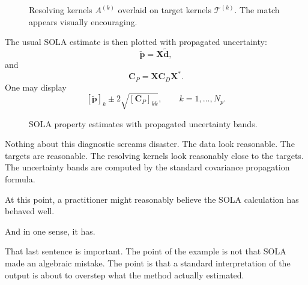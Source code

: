\documentclass[11pt,openany]{book}
\theoremstyle{definition}
\theoremstyle{remark}
\begin{document}
\begin{figure}[ht]
  \centering
  \caption{Resolving kernels \(A^{(k)}\) overlaid on target kernels
  \(\mathcal T^{(k)}\). The match appears visually encouraging.}
  \label{fig:act7-resolving-vs-target}
\end{figure}

The usual SOLA estimate is then plotted with propagated uncertainty:
\[
  \widetilde{\mathbf p}
  =
  \mathbf X\widetilde{\mathbf d},
\]
and
\[
  \mathbf C_P
  =
  \mathbf X\mathbf C_D\mathbf X^*.
\]
One may display
\[
  [\widetilde{\mathbf p}]_k
  \pm
  2\sqrt{[\mathbf C_P]_{kk}},
  \qquad k=1,\dots,N_p.
\]

\begin{figure}[ht]
  \centering
  \caption{SOLA property estimates with propagated uncertainty bands.}
  \label{fig:act7-sola-estimates}
\end{figure}

Nothing about this diagnostic screams disaster. The data look reasonable. The targets are
reasonable. The resolving kernels look reasonably close to the targets. The uncertainty bands are
computed by the standard covariance propagation formula.

\begin{checkpointbox}
At this point, a practitioner might reasonably believe the SOLA calculation has behaved well.
\end{checkpointbox}

And in one sense, it has.

That last sentence is important. The point of the example is not that SOLA made an algebraic
mistake. The point is that a standard interpretation of the output is about to overstep what the
method actually estimated.
\end{document}
